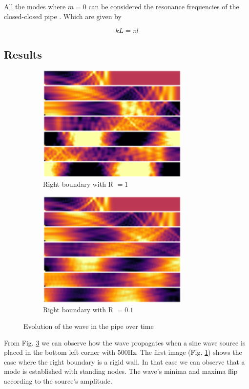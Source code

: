 \documentclass[twocolumn]{article}
\begin{document}
All the modes where $m=0$ can be considered the resonance frequencies of the closed-closed
pipe \cite{PipesResonators}.
Which are given by

\begin{equation}
    kL = \pi l
\end{equation}

\subsection{Results}
\begin{figure}[H]
    \begin{subfigure}[]{75mm}
        \centering
        \includegraphics[width=75mm]{./Images/pipe_evolution_r1.png}
        \caption{Right boundary with R $= 1$}
        \label{fig_pipe_evo_r1}
    \end{subfigure}
    \begin{subfigure}[]{75mm}
        \centering
        \includegraphics[width=75mm]{./Images/pipe_evolution_r01.png}
        \caption{Right boundary with R $= 0.1$}
        \label{fig_pipe_evo_r01}
    \end{subfigure}
    \caption{Evolution of the wave in the pipe over time}
    \label{fig_pipe_evolution}
\end{figure}

From Fig. \ref{fig_pipe_evolution} we can observe how the wave propagates when a sine wave source
is placed in the bottom left corner with $500 \text{Hz}$.
The first image (Fig. \ref{fig_pipe_evo_r1}) shows the case where the right boundary is a rigid wall.
In that case we can observe that a mode is established with standing nodes.
The wave's minima and maxima flip according to the source's amplitude.
\end{document}
